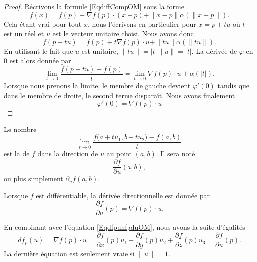 \begin{proof}
    Récrivons la formule \eqref{EqdiffCompOM} sous la forme
    \begin{equation}
        f(x)=f(p)+\nabla f(p)\cdot (x-p)+\| x-p \|\alpha(\| x-p \|).
    \end{equation}
    Cela étant vrai pour tout $x$, nous l'écrivons en particulier pour $x=p+tu$ où $t$ est un réel et $u$ est le vecteur unitaire choisi. Nous avons donc
    \begin{equation}
        f(p+tu)=f(p)+t\nabla f(p)\cdot u+\| tu \|\alpha(\| tu \|).
    \end{equation}
    En utilisant le fait que $u$ est unitaire, $\| tu \|=| t |\| u \|=| t |$. La dérivée de $\varphi$ en $0$ est alors donnée par
    \begin{equation}
        \lim_{t\to 0} \frac{ f(p+tu)-f(p) }{ t }=\lim_{t\to 0} \nabla f(p)\cdot u+\alpha(| t |).    
    \end{equation}
    Lorsque nous prenons la limite, le membre de gauche devient $\varphi'(0)$ tandis que dans le membre de droite, le second terme disparaît. Nous avons finalement
    \begin{equation}
        \varphi'(0)=\nabla f(p)\cdot u
    \end{equation}
\end{proof}

\begin{definition}
    Le nombre
    \begin{equation}
        \lim_{t\to 0} \frac{ f\big( a+tu_1,b+tu_2 \big)-f(a,b) }{ t }
    \end{equation}
    est la  de $f$ dans la direction de $u$ au point $(a,b)$. Il sera noté
    \begin{equation}
        \frac{ \partial f }{ \partial u }(a,b),
    \end{equation}
    ou plus simplement $\partial_uf(a,b)$.
\end{definition}

Lorsque $f$ est différentiable, la dérivée directionnelle est donnée par
\begin{equation}        \label{EqDerDirnablauOM}
    \frac{ \partial f }{ \partial u }(p)=\nabla f(p)\cdot u.
\end{equation}

En combinant avec l'équation \eqref{EqdfpunfpduOM}, nous avons la suite d'égalités
\begin{equation}        \label{EqsuitedfnfdsdfuOM}
    df_p(u)=\nabla f(p)\cdot u=\frac{ \partial f }{ \partial x }(p)u_1+\frac{ \partial f }{ \partial y }(p)u_2+\frac{ \partial f }{ \partial z }(p)u_3=\frac{ \partial f }{ \partial u }(p).
\end{equation}
La dernière équation est seulement vraie si $\| u \|=1$.

